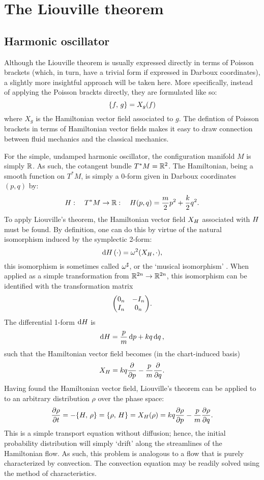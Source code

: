 \chapter{The Liouville theorem}

\section{Harmonic oscillator}
Although the Liouville theorem is usually expressed directly in terms of Poisson brackets (which, in turn, have a trivial form if expressed in Darboux coordinates), a slightly more insightful approach will be taken here. More specifically, instead of applying the Poisson brackts directly, they are formulated like so:
$$ \qty{f,\,g} = X_g(f) $$
where $X_g$ is the Hamiltonian vector field associated to $g$. The defintion of Poisson brackets in terms of Hamiltonian vector fields makes it easy to draw connection between fluid mechanics and the classical mechanics.

For the simple, undamped harmonic oscillator, the configuration manifold $M$ is simply $\mathbb{R}$. As such, the cotangent bundle $T^*M = \mathbb{R}^2$. The Hamiltonian, being a smooth function on $T^*M$, is simply a 0-form given in Darboux coordinates $(p, q)$ by:
\begin{equation}
    H:\quad T^*M \to \mathbb{R}:\quad H(p, q) = \frac{m}{2}p^2 + \frac{k}{2}q^2.
\end{equation}
To apply Liouville's theorem, the Hamiltonian vector field $X_{H}$ associated with $H$ must be found. By definition, one can do this by virtue of the natural isomorphism induced by the symplectic 2-form:
$$ \dd{\ensuremath{H}}(\cdot) = \omega^2(X_{H}, \cdot), $$
this isomorphism is sometimes called $\omega^\sharp$, or the `musical isomorphism' \cite{Abraham1978}. When applied as a simple transformation from $\mathbb{R}^{2n} \to \mathbb{R}^{2n}$, this isomorphism can be identified with the transformation matrix \cite{Arnold1989}
$$ \mqty(0_n & -I_n \\ I_n & 0_n). $$
The differential 1-form $\dd{\ensuremath{H}}$ is
$$ \dd{\ensuremath{H}} = \frac{p}{m}\dd{p} + kq\dd{q}, $$ 
such that the Hamiltonian vector field becomes (in the chart-induced basis)
$$ X_{H} = kq\pdv{}{p} - \frac{p}{m}\pdv{}{q}. $$
Having found the Hamiltonian vector field, Liouville's theorem can be applied to to an arbitrary distribution $\rho$ over the phase space:
\begin{equation}
    \pdv{\rho}{t} = -\qty{H,\,\rho} = \qty{\rho,\,H} = X_H(\rho) = kq\pdv{\rho}{p} - \frac{p}{m}\pdv{\rho}{q}.
    \label{eq:pde_ho}
\end{equation}
This is a simple transport equation without diffusion; hence, the initial probability distribution will simply `drift' along the streamlines of the Hamiltonian flow. As such, this problem is analogous to a flow that is purely characterized by convection. The convection equation may be readily solved using the method of characteristics.

